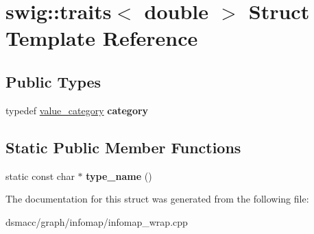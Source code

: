 \hypertarget{structswig_1_1traits_3_01double_01_4}{}\section{swig\+:\+:traits$<$ double $>$ Struct Template Reference}
\label{structswig_1_1traits_3_01double_01_4}
\subsection*{Public Types}
\begin{DoxyCompactItemize}
\item 
\mbox{\label{structswig_1_1traits_3_01double_01_4_a003467ac91b8ca5a649cdf68f82ab7de}} 
typedef \mbox{\hyperlink{structswig_1_1value__category}{value\+\_\+category}} {\bfseries category}
\end{DoxyCompactItemize}
\subsection*{Static Public Member Functions}
\begin{DoxyCompactItemize}
\item 
\mbox{\label{structswig_1_1traits_3_01double_01_4_a2474db5e0109bff332ac101c976a8b22}} 
static const char $\ast$ {\bfseries type\+\_\+name} ()
\end{DoxyCompactItemize}


The documentation for this struct was generated from the following file\+:\begin{DoxyCompactItemize}
\item 
dsmacc/graph/infomap/infomap\+\_\+wrap.\+cpp\end{DoxyCompactItemize}
